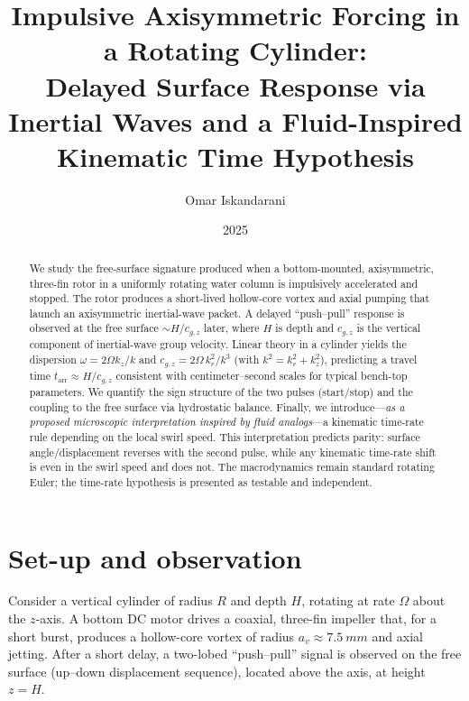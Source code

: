 \documentclass[12pt]{article}
\title{Impulsive Axisymmetric Forcing in a Rotating Cylinder:\\
Delayed Surface Response via Inertial Waves and a Fluid-Inspired Kinematic Time Hypothesis}
\author{Omar Iskandarani}
\date{2025}
\newcommand{\Om}{\Omega}
\begin{document}
\maketitle

\begin{abstract}
We study the free-surface signature produced when a bottom-mounted, axisymmetric, three-fin rotor in a uniformly rotating water column is impulsively accelerated and stopped. The rotor produces a short-lived hollow-core vortex and axial pumping that launch an axisymmetric inertial-wave packet. A delayed ``push--pull'' response is observed at the free surface $\sim H/c_{g,z}$ later, where $H$ is depth and $c_{g,z}$ is the vertical component of inertial-wave group velocity. Linear theory in a cylinder yields the dispersion $\omega=2\Om k_z/k$ and $c_{g,z}=2\Om\,k_r^2/k^3$ (with $k^2=k_r^2+k_z^2$), predicting a travel time $t_{\mathrm{arr}}\approx H/c_{g,z}$ consistent with centimeter--second scales for typical bench-top parameters. We quantify the sign structure of the two pulses (start/stop) and the coupling to the free surface via hydrostatic balance. Finally, we introduce---\emph{as a proposed microscopic interpretation inspired by fluid analogs}---a kinematic time-rate rule depending on the local swirl speed. This interpretation predicts parity: surface angle/displacement reverses with the second pulse, while any kinematic time-rate shift is even in the swirl speed and does not. The macrodynamics remain standard rotating Euler; the time-rate hypothesis is presented as testable and independent.
\end{abstract}

\section{Set-up and observation}
Consider a vertical cylinder of radius $R$ and depth $H$, rotating at rate $\Om$ about the $z$-axis. A bottom DC motor drives a coaxial, three-fin impeller that, for a short burst, produces a hollow-core vortex of radius $a_v\approx \SI{7.5}{mm}$ and axial jetting. After a short delay, a two-lobed ``push--pull'' signal is observed on the free surface (up--down displacement sequence), located above the axis, at height $z=H$.
\end{document}
